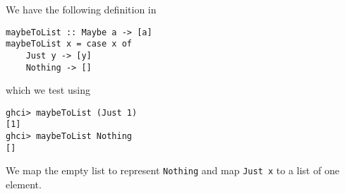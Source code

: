 
We have the following definition in 
\begin{verbatim}
maybeToList :: Maybe a -> [a]
maybeToList x = case x of
    Just y -> [y]
    Nothing -> []
\end{verbatim}
which we test using
\begin{verbatim}
ghci> maybeToList (Just 1)
[1]
ghci> maybeToList Nothing
[]
\end{verbatim}
We map the empty list to represent \verb|Nothing| and map \verb|Just x| to a list 
of one element.
